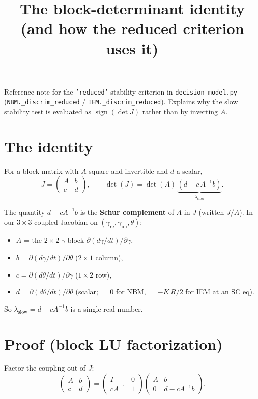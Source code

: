 \documentclass[11pt]{article}
\title{The block-determinant identity\\
       (and how the reduced criterion uses it)}
\author{}
\date{}
\DeclareMathOperator{\sign}{sign}
\begin{document}
\maketitle

Reference note for the \texttt{'reduced'} stability criterion in
\texttt{decision\_model.py} (\texttt{NBM.\_discrim\_reduced} /
\texttt{IEM.\_discrim\_reduced}). Explains why the slow stability test is
evaluated as $\sign(\det J)$ rather than by inverting $A$.

\section{The identity}

For a block matrix with $A$ square and invertible and $d$ a scalar,
\[
J=\begin{pmatrix} A & b \\ c & d\end{pmatrix},
\qquad
\det(J) = \det(A)\,\underbrace{\left(d - c\,A^{-1}b\right)}_{\lambda_{\text{slow}}}.
\]

The quantity $d - c A^{-1} b$ is the \textbf{Schur complement} of $A$ in $J$
(written $J/A$). In our $3\times 3$ coupled Jacobian on
$(\gamma_{\mathrm{re}}, \gamma_{\mathrm{im}}, \theta)$:

\begin{itemize}
  \item $A$ = the $2\times 2$ $\gamma$ block $\partial(d\gamma/dt)/\partial\gamma$,
  \item $b = \partial(d\gamma/dt)/\partial\theta$ ($2\times 1$ column),
  \item $c = \partial(d\theta/dt)/\partial\gamma$ ($1\times 2$ row),
  \item $d = \partial(d\theta/dt)/\partial\theta$ (scalar; $=0$ for NBM,
        $=-K\,R/2$ for IEM at an SC eq).
\end{itemize}

So $\lambda_{\text{slow}} = d - c A^{-1} b$ is a single real number.

\section{Proof (block LU factorization)}

Factor the coupling out of $J$:
\[
\begin{pmatrix} A & b \\ c & d\end{pmatrix}
=
\begin{pmatrix} I & 0 \\ c A^{-1} & 1\end{pmatrix}
\begin{pmatrix} A & b \\ 0 & d - cA^{-1}b\end{pmatrix}.
\]
\end{document}
